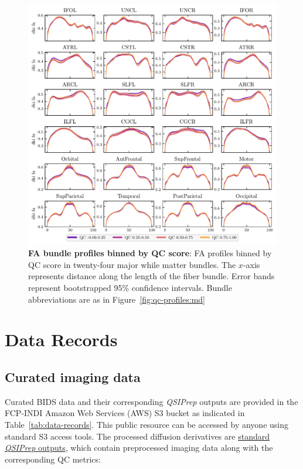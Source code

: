 \documentclass[fleqn,10pt,inline]{wlscirep}
\begin{document}
\begin{figure}[tbp]
    \centering
    \includegraphics[width=\linewidth]{bundle-profiles/qc-bins-dki-fa.pdf}
    \caption[FA bundle profiles]{%
        {\bf FA bundle profiles binned by QC score}:
        FA profiles binned by QC score in twenty-four major while matter
        bundles. The $x$-axis represents distance along the length of the fiber
        bundle. Error bands represent bootstrapped 95\% confidence intervals.
        Bundle abbreviations are as in Figure~\ref{fig:qc-profiles:md}
    }
    \label{fig:qc-profiles:fa}
\end{figure}

\section*{Data Records}

\subsection*{Curated imaging data}

Curated BIDS data and their corresponding \emph{QSIPrep} outputs are provided in the FCP-INDI Amazon Web Services (AWS) S3 bucket  as indicated in Table~\ref{tab:data-records}.
This public resource can be accessed by anyone using standard S3 access tools.
The processed diffusion derivatives are \href{
https://qsiprep.readthedocs.io/en/latest/preprocessing.html#outputs-of-qsiprep}{
standard \emph{QSIPrep} outputs}, which contain preprocessed imaging data
along with the corresponding QC metrics:
\end{document}
